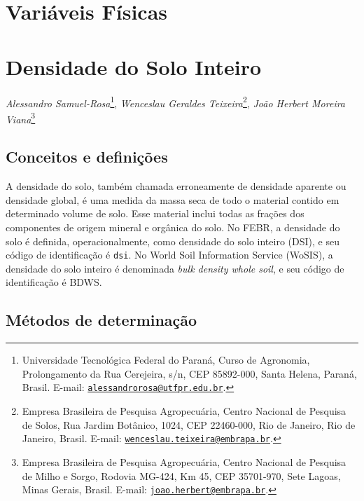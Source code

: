 \documentclass[
]{book}
\begin{document}
\hypertarget{variuxe1veis-fuxedsicas}{%
\chapter*{Variáveis Físicas}\label{variuxe1veis-fuxedsicas}}

\hypertarget{densidade-do-solo-inteiro}{%
\chapter{Densidade do Solo Inteiro}\label{densidade-do-solo-inteiro}}

\emph{Alessandro Samuel-Rosa}\footnote{Universidade Tecnológica Federal do Paraná, Curso de Agronomia, Prolongamento da Rua Cerejeira, s/n, CEP 85892-000, Santa Helena, Paraná, Brasil. E-mail: \href{mailto:alessandrorosa@utfpr.edu.br}{\nolinkurl{alessandrorosa@utfpr.edu.br}}.}, \emph{Wenceslau Geraldes Teixeira}\footnote{Empresa Brasileira de Pesquisa Agropecuária, Centro Nacional de Pesquisa de Solos, Rua Jardim Botânico, 1024, CEP 22460-000, Rio de Janeiro, Rio de Janeiro, Brasil. E-mail: \href{mailto:wenceslau.teixeira@embrapa.br}{\nolinkurl{wenceslau.teixeira@embrapa.br}}.}, \emph{João Herbert Moreira Viana}\footnote{Empresa Brasileira de Pesquisa Agropecuária, Centro Nacional de Pesquisa de Milho e Sorgo, Rodovia MG-424, Km 45, CEP 35701-970, Sete Lagoas, Minas Gerais, Brasil. E-mail: \href{mailto:joao.herbert@embrapa.br}{\nolinkurl{joao.herbert@embrapa.br}}.}

\hypertarget{conceitos-e-definiuxe7uxf5es-1}{%
\section{Conceitos e definições}\label{conceitos-e-definiuxe7uxf5es-1}}

A densidade do solo, também chamada erroneamente de densidade aparente ou densidade global, é uma medida da massa seca de todo o material contido em determinado volume de solo. Esse material inclui todas as frações dos componentes de origem mineral e orgânica do solo. No FEBR, a densidade do solo é definida, operacionalmente, como densidade do solo inteiro (DSI), e seu código de identificação é \texttt{dsi}. No World Soil Information Service (WoSIS), a densidade do solo inteiro é denominada \emph{bulk density whole soil}, e seu código de identificação é BDWS.

\hypertarget{muxe9todos-de-determinauxe7uxe3o}{%
\section{Métodos de determinação}\label{muxe9todos-de-determinauxe7uxe3o}}
\end{document}
